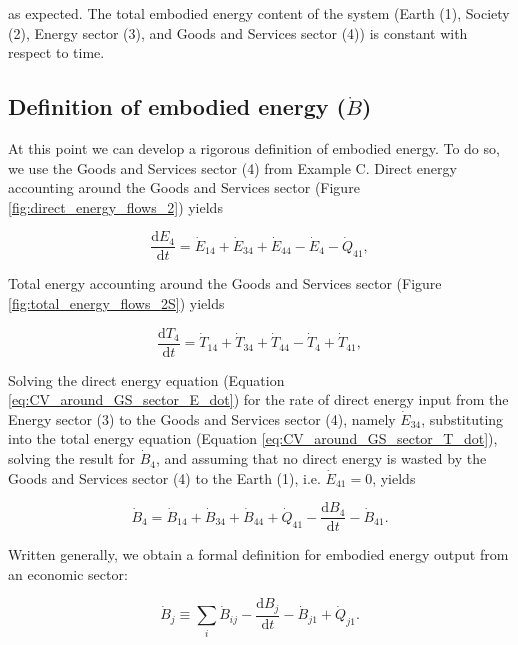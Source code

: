 \documentclass[authoryear,preprint,review,12pt]{elsarticle}
\begin{document}
\noindent as expected. The total embodied energy content of the system (Earth (1), Society (2), Energy sector (3), and Goods and Services sector (4)) is constant with respect to time.


\subsection{Definition of embodied energy ($\dot{B}$)}\label{sec:embodied_energy}

At this point we can develop a rigorous definition of embodied energy. To do so, we use the Goods and Services sector (4) from Example C. Direct energy accounting around the Goods and Services sector (Figure \ref{fig:direct_energy_flows_2}) yields

\begin{equation} \label{eq:CV_around_GS_sector_E_dot}
	\frac{\mathrm{d}E_{4}}{\mathrm{d}t} = \dot{E}_{14} + \dot{E}_{34} + \dot{E}_{44} - \dot{E}_{4} - \dot{Q}_{41},
\end{equation}

Total energy accounting around the Goods and Services sector (Figure \ref{fig:total_energy_flows_2S}) yields

\begin{equation} \label{eq:CV_around_GS_sector_T_dot}
	\frac{\mathrm{d}T_{4}}{\mathrm{d}t} = \dot{T}_{14} + \dot{T}_{34} + \dot{T}_{44} - \dot{T}_{4} + \dot{T}_{41},
\end{equation}

Solving the direct energy equation (Equation \ref{eq:CV_around_GS_sector_E_dot}) for the rate of direct energy input from the Energy sector (3) to the Goods and Services sector (4), namely $\dot{E}_{34}$, substituting into the total energy equation (Equation \ref{eq:CV_around_GS_sector_T_dot}), solving the result for $\dot{B}_{4}$, and assuming that no direct energy is wasted by the Goods and Services sector (4) to the Earth (1), i.e. $\dot{E}_{41} = 0$, yields

\begin{equation} \label{eq:embodied_output_GS}
	\dot{B}_{4} = \dot{B}_{14} + \dot{B}_{34} + \dot{B}_{44} + \dot{Q}_{41} - \frac{\mathrm{d}B_{4}}{\mathrm{d}t} - \dot{B}_{41}.
\end{equation}

Written generally, we obtain a formal definition for embodied energy output from an economic sector:

\begin{equation} \label{eq:embodied_def_1}
	\dot{B}_{j} \equiv \displaystyle\sum_{i} \dot{B}_{ij} - \frac{\mathrm{d}B_{j}}{\mathrm{d}t} - \dot{B}_{j1} + \dot{Q}_{j1}.
\end{equation}
\end{document}
